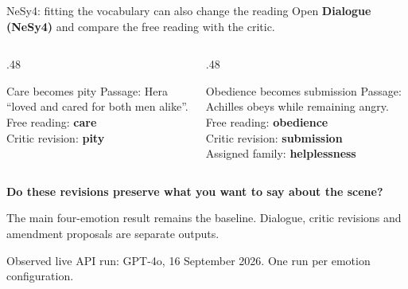 \documentclass[aspectratio=169,10pt]{beamer}
\newcommand{\key}[1]{\textcolor{aegean}{\textbf{#1}}}
\newcommand{\hl}[1]{\textcolor{terracotta}{\textbf{#1}}}
\newcommand{\source}[1]{\vfill{\scriptsize\color{slate}#1\par}}
\newcommand{\observed}{\source{Observed live API run: GPT-4o, 16 September 2026. One run per emotion configuration.}}
\newcommand{\question}[1]{\medskip\par\key{#1}\par}
\begin{document}
\begin{frame}{NeSy4: fitting the vocabulary can also change the reading}
  \small Open \textbf{Dialogue (NeSy4)} and compare the free reading with the critic.
  \begin{columns}[T]
    \begin{column}{.48\textwidth}
      \begin{block}{Care becomes pity}
        Passage: Hera “loved and cared for both men alike”.\\[7pt]
        Free reading: \key{care}\\
        Critic revision: \hl{pity}
      \end{block}
    \end{column}
    \begin{column}{.48\textwidth}
      \begin{block}{Obedience becomes submission}
        Passage: Achilles obeys while remaining angry.\\[7pt]
        Free reading: \key{obedience}\\
        Critic revision: \hl{submission}\\
        Assigned family: \textbf{helplessness}
      \end{block}
    \end{column}
  \end{columns}
  \question{Do these revisions preserve what you want to say about the scene?}
  \small The main four-emotion result remains the baseline. Dialogue, critic revisions and amendment proposals are separate outputs.
  \observed
\end{frame}
\end{document}
